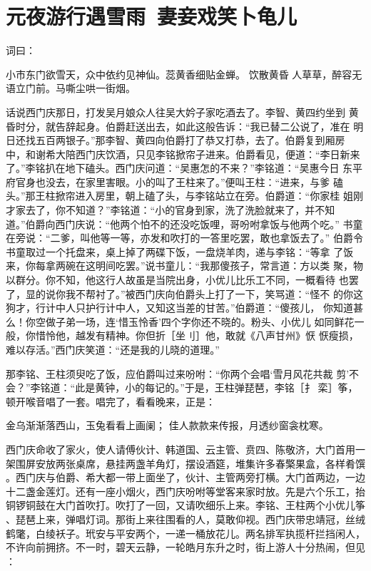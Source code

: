 \chapter{元夜游行遇雪雨~妻妾戏笑卜龟儿}

词曰：

小市东门欲雪天，众中依约见神仙。蕊黄香细贴金蝉。  饮散黄昏
人草草，醉容无语立门前。马嘶尘哄一街烟。

话说西门庆那日，打发吴月娘众人往吴大妗子家吃酒去了。李智、黄四约坐到
黄昏时分，就告辞起身。伯爵赶送出去，如此这般告诉：“我已替二公说了，准在
明日还找五百两银子。”那李智、黄四向伯爵打了恭又打恭，去了。伯爵复到厢房
中，和谢希大陪西门庆饮酒，只见李铭掀帘子进来。伯爵看见，便道：“李日新来
了。”李铭扒在地下磕头。西门庆问道：“吴惠怎的不来？”李铭道：“吴惠今日
东平府官身也没去，在家里害眼。小的叫了王柱来了。”便叫王柱：“进来，与爹
磕头。”那王柱掀帘进入房里，朝上磕了头，与李铭站立在旁。伯爵道：“你家桂
姐刚才家去了，你不知道？”李铭道：“小的官身到家，洗了洗脸就来了，并不知
道。”伯爵向西门庆说：“他两个怕不的还没吃饭哩，哥吩咐拿饭与他两个吃。”
书童在旁说：“二爹，叫他等一等，亦发和吹打的一答里吃罢，敢也拿饭去了。”
伯爵令书童取过一个托盘来，桌上掉了两碟下饭，一盘烧羊肉，递与李铭：“等拿
了饭来，你每拿两碗在这明间吃罢。”说书童儿：“我那傻孩子，常言道：方以类
聚，物以群分。你不知，他这行人故虽是当院出身，小优儿比乐工不同，一概看待
也罢了，显的说你我不帮衬了。”被西门庆向伯爵头上打了一下，笑骂道：“怪不
的你这狗才，行计中人只护行计中人，又知这当差的甘苦。”伯爵道：“傻孩儿，
你知道甚么！你空做子弟一场，连‘惜玉怜香’四个字你还不晓的。粉头、小优儿
如同鲜花一般，你惜怜他，越发有精神。你但折［坐刂］他，敢就《八声甘州》恹
恹瘦损，难以存活。”西门庆笑道：“还是我的儿晓的道理。”

那李铭、王柱须臾吃了饭，应伯爵叫过来吩咐：“你两个会唱‘雪月风花共裁
剪’不会？”李铭道：“此是黄钟，小的每记的。”于是，王柱弹琵琶，李铭［扌
栾］筝，顿开喉音唱了一套。唱完了，看看晚来，正是：

金乌渐渐落西山，玉兔看看上画阑；
佳人款款来传报，月透纱窗衾枕寒。

西门庆命收了家火，使人请傅伙计、韩道国、云主管、贲四、陈敬济，大门首用一
架围屏安放两张桌席，悬挂两盏羊角灯，摆设酒筵，堆集许多春檠果盒，各样肴馔
。西门庆与伯爵、希大都一带上面坐了，伙计、主管两旁打横。大门首两边，一边
十二盏金莲灯。还有一座小烟火，西门庆吩咐等堂客来家时放。先是六个乐工，抬
铜锣铜鼓在大门首吹打。吹打了一回，又请吹细乐上来。李铭、王柱两个小优儿筝
、琵琶上来，弹唱灯词。那街上来往围看的人，莫敢仰视。西门庆带忠靖冠，丝绒
鹤氅，白绫袄子。玳安与平安两个，一递一桶放花儿。两名排军执揽杆拦挡闲人，
不许向前拥挤。不一时，碧天云静，一轮皓月东升之时，街上游人十分热闹，但见
：

